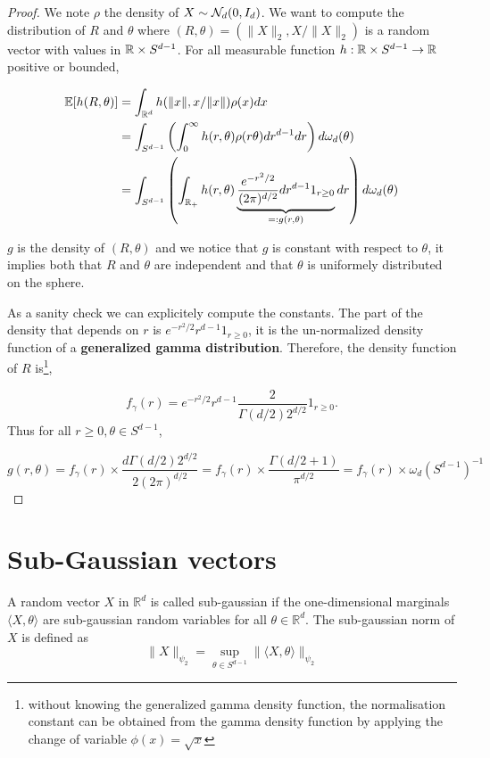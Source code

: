\documentclass{article}
\begin{document}
\begin{proof}
  We note $\rho$ the density of $X \sim \mathcal{N}_d(0,I_d)$. We want to compute the
  distribution of $R$ and $\theta$ where $(R,\theta) = (\|X\|_2,X/\|X\|_2)$ is a random
  vector with values in $\mathbb{R} \times S^{d-1}$. For all measurable function
  $h:\mathbb{R} \times S^{d-1} \to \mathbb{R}$ positive or bounded, 

\begin{equation}
\begin{aligned}
  \mathbb{E}[h(R,\theta)] &= \int_{\mathbb{R}^{d}} h(\|x\|,x/\|x\|)\rho(x) d x \\  &= \int_{S^{d-1}}\left(\int_{0}^{\infty} h(r,\theta) \rho(r\theta)dr^{d-1} d r\right) d \omega_d(\theta) \\
  &= \int_{S^{d-1}}\left(\int_{\mathbb{R}_+} h(r,\theta) \underbrace{\frac{e^{-r^2/2}}{(2\pi)^{d/2}} dr^{d-1}1_{r \geq 0}}_{=: g(r,\theta)} d r\right) d \omega_d(\theta)
\end{aligned}
\end{equation}

$g$ is the density of $(R,\theta)$ and  we notice that $g$ is constant with
respect to $\theta$, it implies both that $R$ and $\theta$ are independent and
that $\theta$ is uniformely distributed on the sphere.

As a sanity check we can explicitely compute the constants. The part of
the density that depends on $r$ is $e^{-r^2/2} r^{d-1}1_{r \geq 0}$, it is the un-normalized
density function of a \textbf{generalized gamma distribution}. Therefore, the
density function of $R$ is\footnote{without knowing the generalized gamma density function, the
  normalisation constant can be obtained from the gamma density
  function by applying the change of variable $\phi(x) = \sqrt{x}$},

$$f_{\gamma}(r) = e^{-r^2/2} r^{d-1} \frac{2}{\Gamma(d/2)2^{d/2}}1_{r \geq 0}.$$
Thus for all $r \geq 0, \theta \in S^{d-1}$,

$$ g(r,\theta) = f_{\gamma}(r) \times \frac{d\Gamma(d/2)2^{d/2}}{2(2\pi)^{d/2}} = f_{\gamma}(r) \times \frac{\Gamma(d/2+1)}{\pi^{d/2}} = f_{\gamma}(r) \times \omega_d(S^{d-1})^{-1}$$
\end{proof}

\section{Sub-Gaussian vectors}

\begin{definition} A random vector $X$ in
  $\mathbb{R}^{d}$ is called sub-gaussian if the one-dimensional marginals
  $\langle X, \theta \rangle$ are sub-gaussian random variables for all $\theta \in \mathbb{R}^{d} .$ The sub-gaussian norm of $X$ is defined as
  $$
  \|X\|_{\psi_{2}}=\sup _{\theta \in S^{d-1}}\|\langle X, \theta\rangle\|_{\psi_{2}}
  $$
\end{definition}
\end{document}
